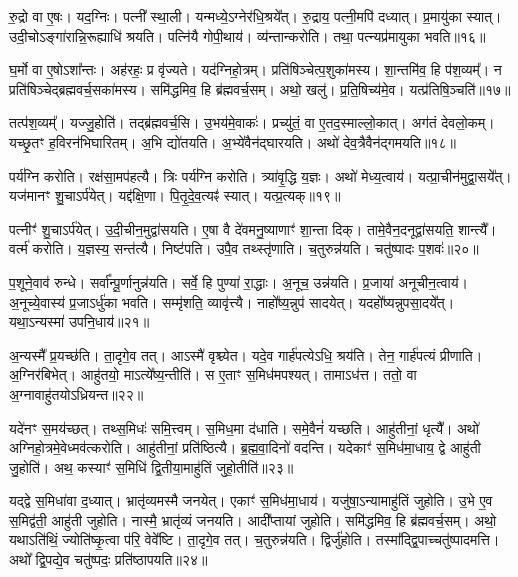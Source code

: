 रु॒द्रो वा ए॒षः।
यद॒ग्निः।
पत्नी᳚ स्था॒ली।
यन्मध्ये॒\-ऽग्नेर॑धि॒श्रये᳚त्।
रु॒द्राय॒ पत्नी॒मपि॑ दध्यात्।
प्र॒मायु॑का स्यात्।
उदी॒चो\-ऽङ्गा॑रान्नि॒रूह्याधि॑ श्रयति।
पत्नि॑यै गोपी॒थाय॑।
व्य॑न्तान्करोति।
तथा॒ पत्न्यप्र॑मायुका भवति॥१६॥\ip

घ॒र्मो वा ए॒षो\-ऽशा᳚न्तः।
अह॑रहः॒ प्र वृ॑ज्यते।
यद॑ग्निहो॒त्रम्।
प्रति॑\-षिञ्चेत्प॒शुका॑मस्य।
शा॒न्तमि॑व॒ हि प॑श॒व्यम्᳚।
न प्रति॑\-षिञ्चेद्ब्रह्मवर्च॒सका॑मस्य।
समि॑द्धमिव॒ हि ब्र॑ह्म\-वर्च॒सम्।
अथो॒ खलु॑।
प्र॒ति॒षिच्य॑मे॒व।
यत्प्र॑तिषि॒ञ्चति॑॥१७॥\ip

तत्प॑श॒व्यम्᳚।
यज्जु॒होति॑।
तद्ब्र॑ह्म\-वर्च॒सि।
उ॒भय॑मे॒वाकः॑।
प्रच्यु॑तं॒ वा ए॒तद॒स्माल्लो॒कात्।
अग॑तं देवलो॒कम्।
यच्छृ॒तꣳ ह॒विरन॑भिघारितम्।
अ॒भि द्यो॑तयति।
अ॒भ्ये॑वैन॑द्\mbox{}घारयति।
अथो॑ देव॒त्रैवैन॑द्गमयति॥१८॥\ip

पर्य॑ग्नि करोति।
रक्ष॑सा॒मप॑हत्यै।
त्रिः पर्य॑ग्नि करोति।
त्र्या॑वृ॒द्धि य॒ज्ञः।
अथो॑ मेध्य॒त्वाय॑।
यत्प्रा॒चीन॑मुद्वा॒सये᳚त्।
यज॑मानꣳ शु॒चा\-ऽर्प॑येत्।
यद्द॑क्षि॒णा।
पि॒तृ॒दे॒व॒त्यꣴ॑ स्यात्।
यत्प्र॒त्यक्॥१९॥\ip

पत्नीꣳ॑ शु॒चा\-ऽर्प॑येत्।
उ॒दी॒चीन॒मुद्वा॑सयति।
ए॒षा वै दे॑वमनु॒ष्याणाꣳ॑ शा॒न्ता दिक्।
तामे॒वैन॒दनूद्वा॑सयति॒ शान्त्यै᳚।
वर्त्म॑ करोति।
य॒ज्ञस्य॒ सन्त॑त्यै।
निष्ट॑पति।
उपै॒व तथ्स्तृ॑णाति।
च॒तुरुन्न॑यति।
चतु॑ष्पादः प॒शवः॑॥२०॥\ip

प॒शूने॒वाव॑ रुन्धे।
सर्वा᳚न्पू॒र्णानुन्न॑यति।
सर्वे॒ हि पुण्या॑ रा॒द्धाः।
अ॒नूच॒ उन्न॑यति।
प्र॒जाया॑ अनूचीन॒त्वाय॑।
अ॒नूच्ये॒वास्य॑ प्र॒जा\-ऽर्धु॑का भवति।
सम्मृ॑शति॒ व्यावृ॑त्त्यै।
नाहो᳚ष्य॒न्नुप॑ सादयेत्।
यदहो᳚ष्यन्नुपसा॒दये᳚त्।
यथा॒ऽन्यस्मा॑ उपनि॒धाय॑॥२१॥\ip

अ॒न्यस्मै᳚ प्र॒यच्छ॑ति।
ता॒दृगे॒व तत्।
आऽस्मै॑ वृश्च्येत।
यदे॒व गार्\mbox{}ह॑पत्येऽधि॒ श्रय॑ति।
तेन॒ गार्\mbox{}ह॑पत्यं प्रीणाति।
अ॒ग्निर॑बिभेत्।
आहु॑तयो॒ माऽत्ये᳚ष्य॒न्तीति॑।
स ए॒ताꣳ स॒मिध॑मपश्यत्।
तामाऽध॑त्त।
ततो॒ वा अ॒ग्नावाहु॑तयो\-ऽध्रियन्त॥२२॥\ip

यदे॑नꣳ स॒मय॑च्छत्।
तथ्स॒मिधः॑ समि॒त्त्वम्।
स॒मिध॒मा द॑धाति।
समे॒वैनं॑ यच्छति।
आहु॑तीनां॒ धृत्यै᳚।
अथो॑ अग्निहो॒त्रमे॒वेध्मव॑त्करोति।
आहु॑तीनां॒ प्रति॑\-ष्ठित्यै।
ब्र॒ह्म॒वा॒दिनो॑ वदन्ति।
यदेकाꣳ॑ स॒मिध॑मा॒धाय॒ द्वे आहु॑ती जु॒होति॑।
अथ॒ कस्याꣳ॑ स॒मिधि॑ द्वि॒तीया॒माहु॑तिं जुहो॒तीति॑॥२३॥\ip

यद्द्वे स॒मिधा॑वा द॒ध्यात्।
भ्रातृ॑व्यमस्मै जनयेत्।
एकाꣳ॑ स॒मिध॑मा॒धाय॑।
यजु॑षा॒\-ऽन्यामाहु॑तिं जुहोति।
उ॒भे ए॒व स॒मिद्व॑ती॒ आहु॑ती जुहोति।
नास्मै॒ भ्रातृ॑व्यं जनयति।
आदी᳚प्तायां जुहोति।
समि॑द्धमिव॒ हि ब्र॑ह्म\-वर्च॒सम्।
अथो॒ यथा\-ऽति॑थिं॒ ज्योति॑ष्कृ॒त्वा प॑रि॒ वेवे᳚ष्टि।
ता॒दृगे॒व तत्।
च॒तुरुन्न॑यति।
द्विर्जु॑होति।
तस्मा᳚द्द्वि॒पाच्चतु॑ष्पादमत्ति।
अथो᳚ द्वि॒पद्ये॒व चतु॑ष्पदः॒ प्रति॑\-ष्ठापयति॥२४॥\ip{}

